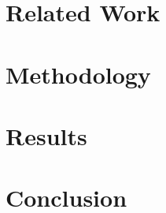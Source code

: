 \documentclass[conference]{IEEEtran}
\begin{document}
\section{Related Work}


\section{Methodology}


\section{Results}


\section{Conclusion}


 

\end{document}

